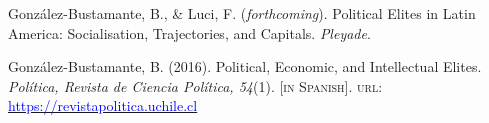 





\begin{cventries}

\begin{benumerate}{2}
\item{\small Gonz\'alez-Bustamante, B., \& Luci, F. ({\itshape forthcoming}). Political Elites in Latin America: Socialisation, Trajectories, and Capitals. {\itshape Pleyade}.}\vspace{1mm}

\item{\small Gonz\'alez-Bustamante, B. (2016). Political, Economic, and Intellectual Elites. {\itshape Pol\'itica, Revista de Ciencia Pol\'itica, 54}(1). {\footnotesize \scshape [in Spanish]}. {\scshape url}: \href{https://revistapolitica.uchile.cl/index.php/RP/issue/view/4365}{\textcolor{blue}{https://revistapolitica.uchile.cl}}} \vspace{1mm}
\end{benumerate}

\end{cventries}
